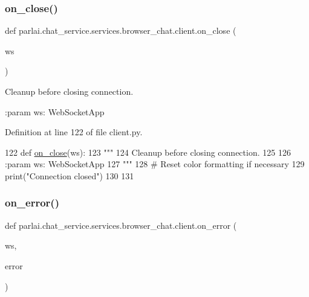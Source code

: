 \subsubsection{\texorpdfstring{on\+\_\+close()}{on\_close()}}
{\footnotesize\ttfamily def parlai.\+chat\+\_\+service.\+services.\+browser\+\_\+chat.\+client.\+on\+\_\+close (\begin{DoxyParamCaption}\item[{}]{ws }\end{DoxyParamCaption})}

\begin{DoxyVerb}Cleanup before closing connection.

:param ws: WebSocketApp
\end{DoxyVerb}
 

Definition at line 122 of file client.\+py.


\begin{DoxyCode}
122 \textcolor{keyword}{def }\hyperlink{namespaceparlai_1_1chat__service_1_1services_1_1terminal__chat_1_1client_a02c04f40cfa11defbf5c83bbe46aba00}{on\_close}(ws):
123     \textcolor{stringliteral}{"""}
124 \textcolor{stringliteral}{    Cleanup before closing connection.}
125 \textcolor{stringliteral}{}
126 \textcolor{stringliteral}{    :param ws: WebSocketApp}
127 \textcolor{stringliteral}{    """}
128     \textcolor{comment}{# Reset color formatting if necessary}
129     print(\textcolor{stringliteral}{"Connection closed"})
130 
131 
\end{DoxyCode}
\mbox{\label{namespaceparlai_1_1chat__service_1_1services_1_1browser__chat_1_1client_a7524afd04a18062c7ba273906adc70f3}} 
\subsubsection{\texorpdfstring{on\+\_\+error()}{on\_error()}}
{\footnotesize\ttfamily def parlai.\+chat\+\_\+service.\+services.\+browser\+\_\+chat.\+client.\+on\+\_\+error (\begin{DoxyParamCaption}\item[{}]{ws,  }\item[{}]{error }\end{DoxyParamCaption})}

